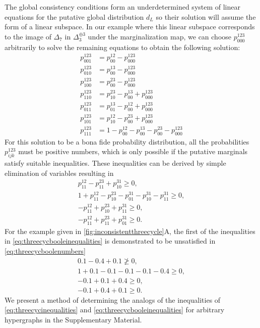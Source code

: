 The global consistency conditions form an underdetermined system of linear equations for the putative global distribution $d_{L}$ so their solution will assume the form of a linear subspace.  In our example where this linear subspace corresponds to the image of $\Delta_7$ in $\Delta_3^{\oplus 3}$ under the marginalization map, we can choose $p^{123}_{000}$ arbitrarily to solve the remaining equations to obtain the following solution:
\begin{align*}
p^{123}_{001} &= p^{12}_{00} - p^{123}_{000} \\
p^{123}_{010} &= p^{13}_{00} - p^{123}_{000} \\
p^{123}_{100} &= p^{23}_{00} - p^{123}_{000} \\
p^{123}_{110} &= p^{23}_{10} - p^{13}_{00} + p^{123}_{000} \\
p^{123}_{011} &= p^{13}_{01} - p^{12}_{00} + p^{123}_{000} \\
p^{123}_{101} &= p^{12}_{10} - p^{23}_{00} + p^{123}_{000} \\
p^{123}_{111} &= 1 - p^{12}_{00} - p^{13}_{00} - p^{23}_{00} - p^{123}_{000}
\end{align*}
For this solution to be a bona fide probability distribution, all the probabilities $p^{123}_{ijk}$ must be positive numbers, which is only possible if the putative marginals satisfy suitable inequalities. These inequalities can be derived by simple elimination of variables resulting in
\begin{equation}
\begin{aligned}\label{eq:threecycbooleinequalities}
p^{12}_{11} - p^{23}_{11} + p^{31}_{10} \geq 0, \\
1 + p^{12}_{11} - p^{23}_{10} - p^{31}_{01} - p^{31}_{10} - p^{31}_{11} \geq 0, \\
-p^{12}_{11} + p^{23}_{10} + p^{31}_{11} \geq 0, \\
-p^{12}_{11} + p^{23}_{11} + p^{31}_{01} \geq 0.
\end{aligned}
\end{equation}
For the example given in \ref{fig:inconsistentthreecycle}A, the first of the inequalities in \ref{eq:threecycbooleinequalities} is demonstrated to be unsatisfied in \ref{eq:threecycboolenumbers}
\begin{equation}
\begin{aligned}\label{eq:threecycboolenumbers}
0.1 - 0.4 + 0.1 \not\geq 0, \\
1 + 0.1 - 0.1 - 0.1 - 0.1 - 0.4 \geq 0, \\
-0.1 + 0.1 + 0.4 \geq 0, \\
-0.1 + 0.4 + 0.1 \geq 0.
\end{aligned}
\end{equation}
We present a method of determining the analogs of the inequalities of \ref{eq:threecycinequalities} and \ref{eq:threecycbooleinequalities} for arbitrary hypergraphs in the Supplementary Material.

